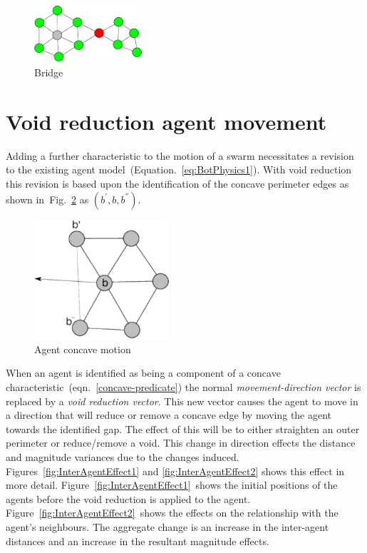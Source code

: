 \documentclass[preprint,12pt]{elsarticle}
\begin{document}
\begin{figure}
\begin{center}
\includegraphics[width=4cm]{figures/PerimeterBots5}
\end{center}
\caption{Bridge\label{fig:Connector2}}
\end{figure}

\section{Void reduction agent movement}\label{concave:AgentMovement}
Adding a further characteristic to the motion of a swarm necessitates a revision to the existing agent model~(Equation.~\ref{eq:BotPhysics1}). With void reduction this revision is based upon the identification of the concave perimeter edges as shown in~Fig.~\ref{concave:VoidConcave1} as $(b^{'},b,b^{''})$. 

\begin{figure}
\begin{center}
\includegraphics[width=5cm]{figures/VoidConcave1}
\end{center}
\caption{Agent concave motion\label{concave:VoidConcave1}}
\end{figure}


When an agent is identified as being a component of a concave
characteristic~(eqn.~\ref{concave-predicate}) the normal \textit{movement-direction vector} is replaced by a \textit{void reduction vector}. This new vector causes the agent to move in a direction that will reduce or remove a concave edge by moving the agent towards the identified gap. The effect of this will be to either straighten an outer perimeter or reduce/remove a void. This change in direction effects the distance and magnitude variances due to the changes induced. Figures~\ref{fig:InterAgentEffect1} and \ref{fig:InterAgentEffect2} shows this effect in more detail. Figure~\ref{fig:InterAgentEffect1}~shows the initial positions of the agents before the void reduction is applied to the agent. Figure~\ref{fig:InterAgentEffect2}~shows the effects on the relationship with the agent's neighbours. The aggregate change is an increase in the inter-agent distances and an increase in the resultant magnitude effects.
\end{document}

